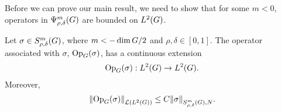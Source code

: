 Before we can prove our main result,
we need to show that for some $m < 0$,
operators in $\OperatorClass m {\rho, \delta}$ are bounded on $\Lebesgue 2 \Group$.

\begin{proposition}
\label{proposition:prepare_L2_boundedness}
    Let $\sigma \in \SymbolClass m {\rho, \delta}$,
    where $m < -\dim \Group / 2$ and $\rho, \delta \in [0, 1]$.
    The operator associated with $\sigma$, $\Op(\sigma)$, has a continuous extension
    \begin{align*}
        \Op(\sigma) : \Lebesgue 2 \Group \to \Lebesgue 2 \Group.
    \end{align*}
    Moreover,
    \begin{align*}
        \norm [\Lin {\Lebesgue 2 \Group}] {\Op(\sigma)}
        \leq C \SymbolSemiNorm m {\rho, \delta} N \sigma.
    \end{align*}
\end{proposition}
